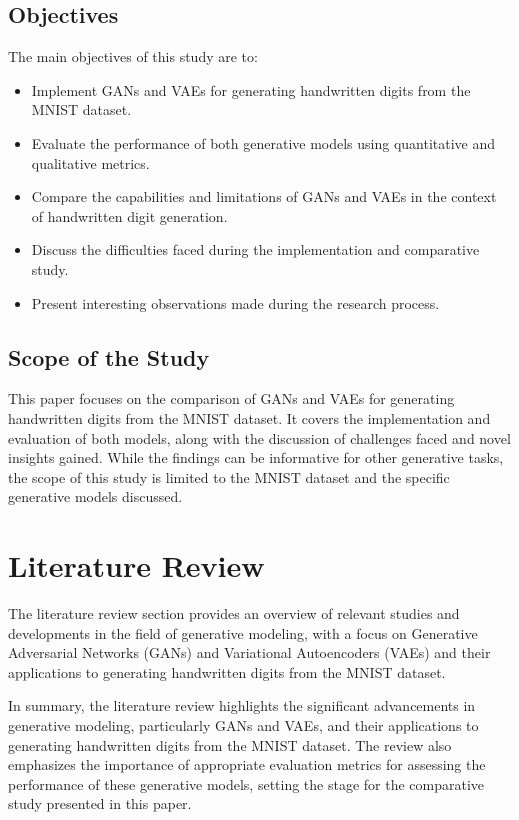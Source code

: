 \documentclass{article}
\begin{document}
\subsection{Objectives}
The main objectives of this study are to:
\begin{itemize}
    \item Implement GANs and VAEs for generating handwritten digits from the MNIST dataset.
    \item Evaluate the performance of both generative models using quantitative and qualitative metrics.
    \item Compare the capabilities and limitations of GANs and VAEs in the context of handwritten digit generation.
    \item Discuss the difficulties faced during the implementation and comparative study.
    \item Present interesting observations made during the research process.
\end{itemize}

\subsection{Scope of the Study}
This paper focuses on the comparison of GANs and VAEs for generating handwritten digits from the MNIST dataset. It covers the implementation and evaluation of both models, along with the discussion of challenges faced and novel insights gained. While the findings can be informative for other generative tasks, the scope of this study is limited to the MNIST dataset and the specific generative models discussed.

\section{Literature Review}
The literature review section provides an overview of relevant studies and developments in the field of generative modeling, with a focus on Generative Adversarial Networks (GANs) and Variational Autoencoders (VAEs) and their applications to generating handwritten digits from the MNIST dataset.

In summary, the literature review highlights the significant advancements in generative modeling, particularly GANs and VAEs, and their applications to generating handwritten digits from the MNIST dataset. The review also emphasizes the importance of appropriate evaluation metrics for assessing the performance of these generative models, setting the stage for the comparative study presented in this paper.
\end{document}
